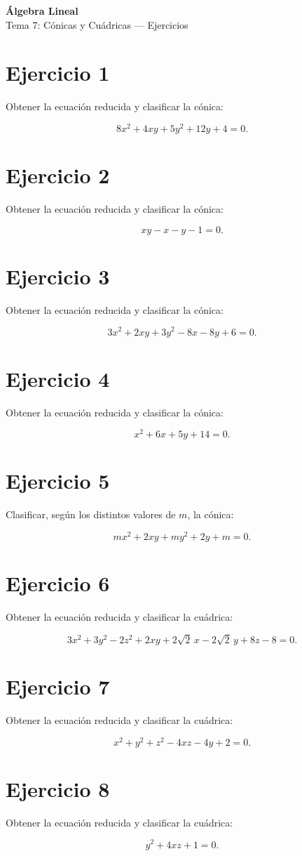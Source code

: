 \documentclass[11pt,a4paper]{article}
\begin{document}
\begin{center}
{\LARGE\bfseries Álgebra Lineal}\\[0.4em]
{\Large Tema 7: Cónicas y Cuádricas --- Ejercicios}
\end{center}

\section{Ejercicio 1}

Obtener la ecuación reducida y clasificar la cónica:

\[
8x^2+4xy+5y^2+12y+4=0.
\]

\section{Ejercicio 2}

Obtener la ecuación reducida y clasificar la cónica:

\[
xy-x-y-1=0.
\]

\section{Ejercicio 3}

Obtener la ecuación reducida y clasificar la cónica:

\[
3x^2+2xy+3y^2-8x-8y+6=0.
\]

\section{Ejercicio 4}

Obtener la ecuación reducida y clasificar la cónica:

\[
x^2+6x+5y+14=0.
\]

\section{Ejercicio 5}

Clasificar, según los distintos valores de $m$, la cónica:

\[
mx^2+2xy+my^2+2y+m=0.
\]

\section{Ejercicio 6}

Obtener la ecuación reducida y clasificar la cuádrica:

\[
3x^2+3y^2-2z^2+2xy
+2\sqrt2\,x-2\sqrt2\,y+8z-8=0.
\]

\section{Ejercicio 7}

Obtener la ecuación reducida y clasificar la cuádrica:

\[
x^2+y^2+z^2-4xz-4y+2=0.
\]

\section{Ejercicio 8}

Obtener la ecuación reducida y clasificar la cuádrica:

\[
y^2+4xz+1=0.
\]
\end{document}
